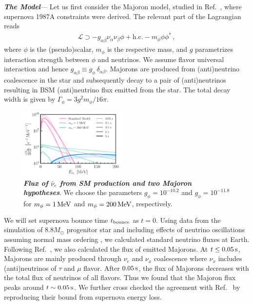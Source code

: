 \documentclass[aps,twocolumn,prl,showpacs,showkeys,preprintnumbers,superscriptaddress,nobibnotes,floatfix,longbibliography,notitlepage,nofootinbib]{revtex4-2}
\begin{document}

\textbf{\textit{The Model}}---
Let us first consider the Majoron model, studied in Ref.~\cite{Fiorillo:2022cdq}, where supernova 1987A constraints were derived.
The relevant part of the Lagrangian reads
\begin{align}
\mathcal{L} \supset -g_{\alpha\beta} \nu_\alpha \nu_\beta \phi + \text{h.c.} - m_\phi \phi\phi^*\,,
\end{align}
where $\phi$ is the (pseudo)scalar, $m_\phi$ is the respective mass, and $g$ parametrizes interaction strength between $\phi$ and neutrinos. We assume flavor universal interaction and hence $g_{\alpha\beta}\equiv g_\phi \, \delta_{\alpha\beta}$. 
Majorons are produced from (anti)neutrino coalescence in the star and subsequently decay to a pair of (anti)neutrinos resulting in BSM (anti)neutrino flux emitted from the star.
The total decay width is given by $\Gamma_\phi = 3g^2 m_\phi/16 \pi$.

\begin{figure}[t!]
    \centering
    \includegraphics[width=0.47\textwidth]{figures/majoran_fluxes.pdf}
    \caption{\textit{\textbf{Flux of $\bar{\nu}_{e}$ from SM production and two Majoron hypotheses}}.
    We choose the parameters $g_\phi = 10^{-10.2}$ and $g_\phi = 10^{-11.8}$ for $m_\phi = \unit[1]{MeV}$ and $m_\phi = \unit[200]{MeV}$, respectively.
    }
    \label{fig:fluxes}
\end{figure}

We will set supernova bounce time $t_{\rm bounce}$ as $t = 0$.
Using data from the simulation of $8.8 M_\odot$ progenitor star \cite{Huedepohl2010} and including effects of neutrino oscillations assuming normal mass ordering \cite{Dighe:1999bi}, we calculated standard neutrino fluxes at Earth. Following Ref.~\cite{Fiorillo:2022cdq}, we also calculated the flux of emitted Majorons.
At $t \leq \unit[0.05]{s}$, Majorons are mainly produced through $\nu_e$ and $\nu_x$ coalescence where $\nu_x$ includes (anti)neutrinos of $\tau$ and $\mu$ flavor. After $\unit[0.05]{s}$, the flux of Majorons decreases with the total flux of neutrinos of all flavors. Thus we found that the Majoron flux peaks around $t \sim \unit[0.05]{s}$. We further cross checked the agreement with Ref.~\cite{Fiorillo:2022cdq} by reproducing their bound from supernova energy loss. 
\end{document}
